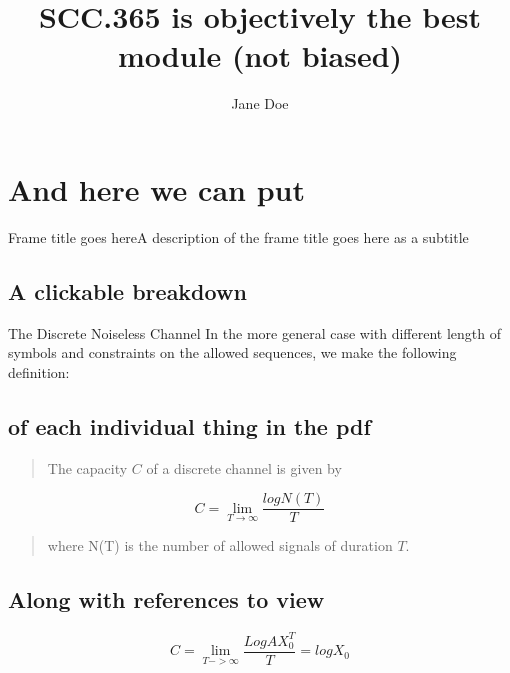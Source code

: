 \documentclass[]{beamer}
\title{SCC.365 is objectively the best module (not biased)}
\author{Jane Doe}
\begin{document}
\maketitle
\section{And here we can put}
\begin{frame}[t]{Frame title goes here}{A description of the frame title goes here as a subtitle}
  \subsection{A clickable breakdown}
  \begin{exampleblock}{The Discrete Noiseless Channel}
    In the more general case with different length of symbols and constraints on the allowed sequences, we make the following definition:
    \subsection{of each individual thing in the pdf}
    \begin{quote}
      The capacity $C$ of a discrete channel is given by
    \end{quote}
    \[ C = \lim_{T \to \infty}  \frac{logN(T)}{T}\]

    \begin{quote}
    where N(T) is the number of allowed signals of duration $T$.
  \end{quote}
\end{exampleblock}
\subsection{Along with references to view}
  \begin{theorem}
    \[C = \lim_{T->\infty}\frac{LogAX^{T}_{0}}{T} = logX_{0}\]
  \end{theorem}
\end{frame}
\end{document}
